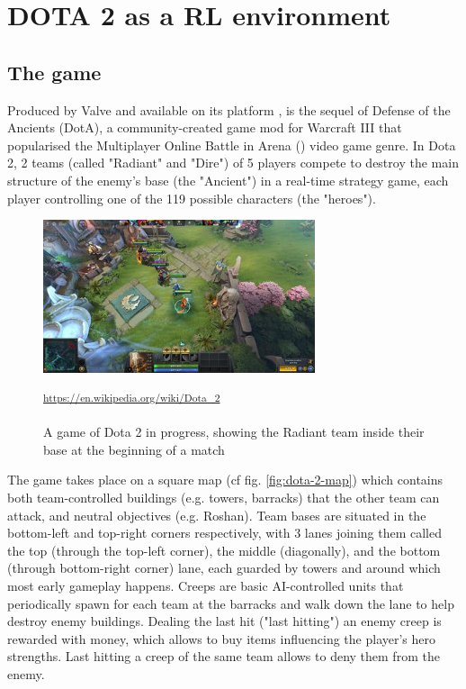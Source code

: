 \section{DOTA 2 as a RL environment}
\subsection{The game}

Produced by Valve and available on its platform ,  is the sequel of Defense of the Ancients (DotA), a community-created game mod for Warcraft III that popularised the Multiplayer Online Battle in Arena () video game genre. In Dota 2, 2 teams (called "Radiant" and "Dire") of 5 players compete to destroy the main structure of the enemy's base (the "Ancient") in a real-time strategy game, each player controlling one of the 119 possible characters (the "heroes").

\begin{figure}[H]
 \centering
 \captionsetup{justification=centering, margin=0.5cm}
 \includegraphics[width=8cm]{images/Dota_2_Gameplay_Aug_2017.jpg}
\caption{A game of Dota 2 in progress, showing the Radiant team inside their base at the beginning of a match}
 \small\textsuperscript{\url{https://en.wikipedia.org/wiki/Dota_2}}
 \label{fig:dota-2-game}
\end{figure}

The game takes place on a square map (cf fig. \ref{fig:dota-2-map}) which contains both team-controlled buildings (e.g. towers, barracks) that the other team can attack, and neutral objectives (e.g. Roshan). Team bases are situated in the bottom-left and top-right corners respectively, with 3 lanes joining them called the top (through the top-left corner), the middle (diagonally), and the bottom (through bottom-right corner) lane, each guarded by towers and around which most early gameplay happens. Creeps are basic AI-controlled units that periodically spawn for each team at the barracks and walk down the lane to help destroy enemy buildings. Dealing the last hit ("last hitting") an enemy creep is rewarded with money, which allows to buy items influencing the player's hero strengths. Last hitting a creep of the same team allows to deny them from the enemy. 

